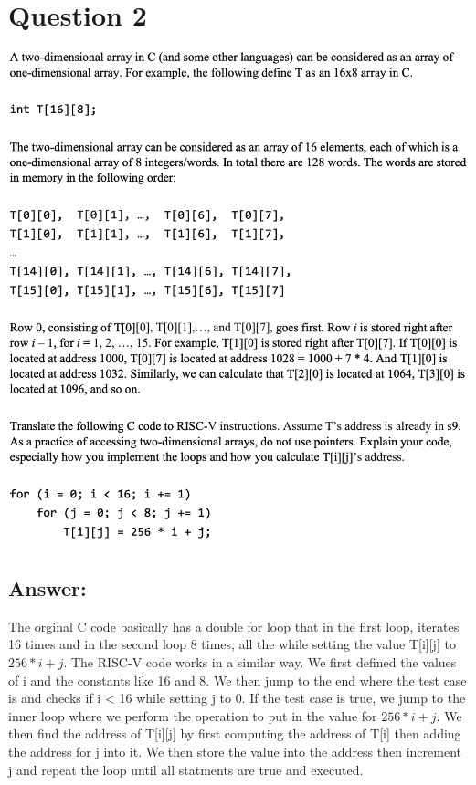 \documentclass{article}
\begin{document}
\section*{Question 2}
\begin{center}
    \includegraphics[scale=.534]{./images/q2Question.png}
\end{center}

\subsection*{Answer:}
The orginal C code basically has a double for loop that in
the first loop, iterates 16 times and in the second loop 8 times,
all the while setting the value T[i][j] to $256 * i + j$. The RISC-V
code works in a similar way. We first defined the values of i and the constants
like 16 and 8. We then jump to the end where the test case is and checks if
i < 16 while setting j to 0. If the test case is true, we jump to the inner
loop where we perform the operation to put in the value for $256 * i + j$.
We then find the address of T[i][j] by first computing the address of T[i] then 
adding the address for j into it. We then store the value into the address then increment
j and repeat the loop until all statments are true and executed.
\end{document}
